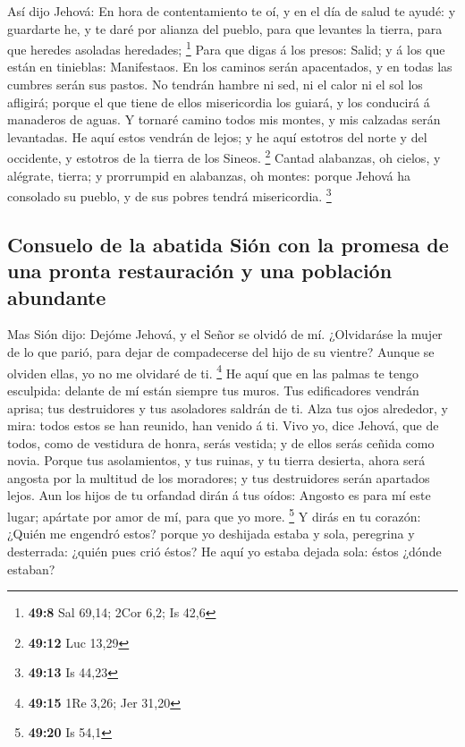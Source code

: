  Así dijo Jehová: En hora de contentamiento te oí, y en el
día de salud te ayudé: y guardarte he, y te daré por alianza del pueblo,
para que levantes la tierra, para que heredes asoladas heredades;
\footnote{\textbf{49:8} Sal 69,14; 2Cor 6,2; Is 42,6}  Para
que digas á los presos: Salid; y á los que están en tinieblas:
Manifestaos. En los caminos serán apacentados, y en todas las cumbres
serán sus pastos.  No tendrán hambre ni sed, ni el calor ni
el sol los afligirá; porque el que tiene de ellos misericordia los
guiará, y los conducirá á manaderos de aguas.  Y tornaré
camino todos mis montes, y mis calzadas serán levantadas. 
He aquí estos vendrán de lejos; y he aquí estotros del norte y del
occidente, y estotros de la tierra de los Sineos. \footnote{\textbf{49:12}
  Luc 13,29}  Cantad alabanzas, oh cielos, y alégrate,
tierra; y prorrumpid en alabanzas, oh montes: porque Jehová ha consolado
su pueblo, y de sus pobres tendrá misericordia. \footnote{\textbf{49:13}
  Is 44,23}

\hypertarget{consuelo-de-la-abatida-siuxf3n-con-la-promesa-de-una-pronta-restauraciuxf3n-y-una-poblaciuxf3n-abundante}{%
\subsection{Consuelo de la abatida Sión con la promesa de una pronta
restauración y una población
abundante}\label{consuelo-de-la-abatida-siuxf3n-con-la-promesa-de-una-pronta-restauraciuxf3n-y-una-poblaciuxf3n-abundante}}

 Mas Sión dijo: Dejóme Jehová, y el Señor se olvidó de mí.
 ¿Olvidaráse la mujer de lo que parió, para dejar de
compadecerse del hijo de su vientre? Aunque se olviden ellas, yo no me
olvidaré de ti. \footnote{\textbf{49:15} 1Re 3,26; Jer 31,20}
 He aquí que en las palmas te tengo esculpida: delante de
mí están siempre tus muros.  Tus edificadores vendrán
aprisa; tus destruidores y tus asoladores saldrán de ti. 
Alza tus ojos alrededor, y mira: todos estos se han reunido, han venido
á ti. Vivo yo, dice Jehová, que de todos, como de vestidura de honra,
serás vestida; y de ellos serás ceñida como novia.  Porque
tus asolamientos, y tus ruinas, y tu tierra desierta, ahora será angosta
por la multitud de los moradores; y tus destruidores serán apartados
lejos.  Aun los hijos de tu orfandad dirán á tus oídos:
Angosto es para mí este lugar; apártate por amor de mí, para que yo
more. \footnote{\textbf{49:20} Is 54,1}  Y dirás en tu
corazón: ¿Quién me engendró estos? porque yo deshijada estaba y sola,
peregrina y desterrada: ¿quién pues crió éstos? He aquí yo estaba dejada
sola: éstos ¿dónde estaban?

